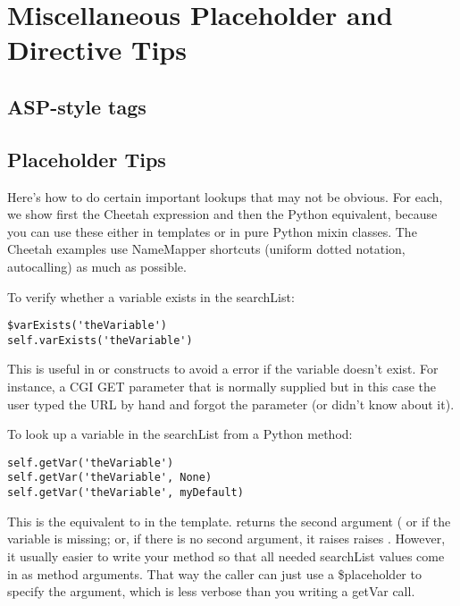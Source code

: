 \section{Miscellaneous Placeholder and Directive Tips}
\label{tips}

\subsection{ASP-style tags}
\label{tips.ASP}

\subsection{Placeholder Tips}
\label{tips.placeholder}

Here's how to do certain important lookups that may not be obvious.
For each, we show first the Cheetah expression and then the Python equivalent,
because you can use these either in templates or in pure Python mixin classes.
The Cheetah examples use NameMapper shortcuts (uniform dotted notation, 
autocalling) as much as possible.

To verify whether a variable exists in the searchList:
\begin{verbatim}
$varExists('theVariable')
self.varExists('theVariable')
\end{verbatim}
This is useful in  or  constructs to avoid a
 error if the variable doesn't exist.  For instance,
a CGI GET parameter that is normally supplied but in this case the user typed
the URL by hand and forgot the parameter (or didn't know about it).

To look up a variable in the searchList from a Python method:
\begin{verbatim}
self.getVar('theVariable')
self.getVar('theVariable', None)
self.getVar('theVariable', myDefault)
\end{verbatim}
This is the equivalent to  in the template.  
returns the second argument ( or  if the variable is
missing; or, if there is no second argument, it raises raises
.  However, it usually easier to write your method
so that all needed searchList values come in as method arguments.  That way
the caller can just use a \$placeholder to specify the argument, which is
less verbose than you writing a getVar call.

